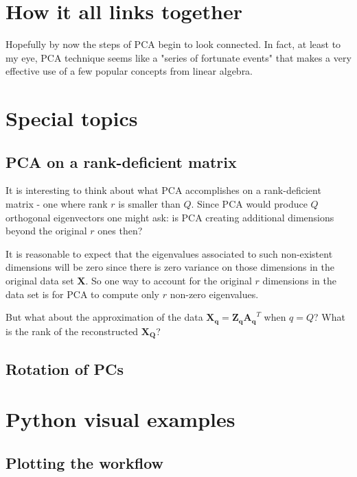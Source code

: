 \documentclass[10pt,twocolumn]{article}
\begin{document}
\section{How it all links together}

Hopefully by now the steps of PCA begin to look connected. In fact, at least to my eye, PCA  technique seems like a "series of fortunate events" that makes a very effective use of a few popular concepts from linear algebra. 



\section{Special topics}

\subsection{PCA on a rank-deficient matrix}

It is interesting to think about what PCA accomplishes on a rank-deficient matrix - one where rank $r$ is smaller than $Q$. Since PCA would produce $Q$ orthogonal eigenvectors one might ask: is PCA creating additional dimensions beyond the original $r$ ones then?

It is reasonable to expect that the eigenvalues associated to such non-existent dimensions will be zero since there is zero variance on those dimensions in the original data set $\bm{X}$. So one way to account for the original $r$ dimensions in the data set is for PCA to compute only $r$ non-zero eigenvalues.

But what about the approximation of the data $\bm{X_q} = \bm{Z_q} \bm{A_q}^T$ when $q=Q$? What is the rank of the reconstructed $\bm{X_Q}$?


\subsection{Rotation of PCs}






\section{Python visual examples}

\subsection{Plotting the workflow}\label{sec:pca-workflow}
\end{document}
